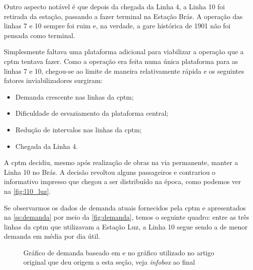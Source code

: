 \documentclass[11pt,fleqn]{book} %
\begin{document}
Outro aspecto notável é que depois da chegada da Linha 4, a Linha 10 foi retirada da estação, passando a fazer terminal na Estação Brás. A operação das linhas 7 e 10 sempre foi ruim e, na verdade, a gare histórica de 1901 não foi pensada como terminal.

Simplesmente faltava uma plataforma adicional para viabilizar a operação que a \gls{cptm} tentava fazer. Como a operação era feita numa única plataforma para as linhas 7 e 10, chegou-se ao limite de maneira relativamente rápida e os seguintes fatores inviabilizadores surgiram:

\begin{itemize}
	\item Demanda crescente nas linhas da \gls{cptm};
	\item Dificuldade de esvaziamento da plataforma central;
	\item Redução de intervalos nas linhas da \gls{cptm};
	\item Chegada da Linha 4.
\end{itemize}

A \gls{cptm} decidiu, mesmo após realização de obras na via permanente, manter a Linha 10 no Brás. A decisão revoltou alguns passageiros e contrariou o informativo impresso que chegou a ser distribuído na época, como podemos ver na \autoref{fig:l10_luz}.

Se observarmos os dados de demanda atuais fornecidos pela \gls{cptm} e apresentados na \autoref{ss:demanda} por meio da \autoref{fig:demanda}, temos o seguinte quadro: entre as três linhas da \gls{cptm} que utilizavam a Estação Luz, a Linha 10 segue sendo a de menor demanda em média por dia útil.

\begin{figure}[!htb]
	\centering
	\caption{Gráfico de demanda baseado em \cite{sitecptm1} e no gráfico utilizado no artigo original que deu origem a esta seção, veja \textit{infobox} ao final}
	\label{fig:demanda2}
\end{figure}
\end{document}
